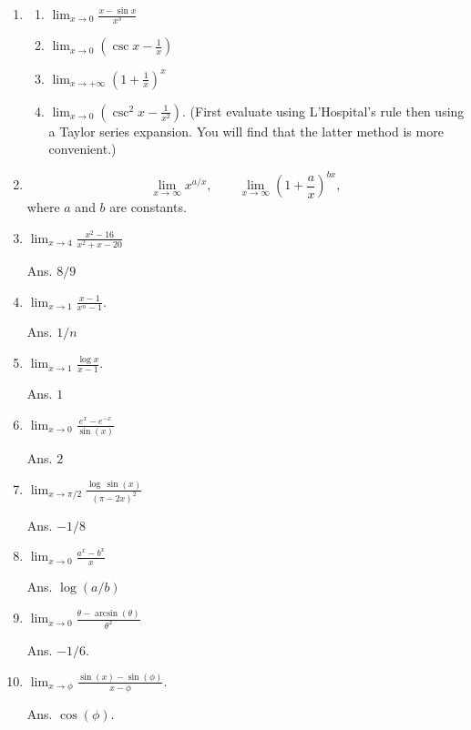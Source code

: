\begin{enumerate}
\item
  \begin{enumerate}
  \item
    $\lim_{x \to 0} \frac{x - \sin x}{x^3}$
  \item
    $\lim_{x \to 0} \left( \csc x - \frac{1}{x} \right)$
  \item
    $\lim_{x \to +\infty} \left( 1 + \frac{1}{x} \right)^x$
  \item
    $\lim_{x \to 0} \left( \csc^2 x - \frac{1}{x^2} \right)$.
    (First evaluate using L'Hospital's rule then using a Taylor series expansion.
    You will find that the latter method is more convenient.)
  \end{enumerate}


\item
  \[
  \lim_{x \to \infty} x^{a/x}, \qquad
  \lim_{x \to \infty} \left( 1 + \frac{a}{x} \right)^{b x},
  \]
  where $a$ and $b$ are constants.


\item
$\lim_{x \to 4}\frac{x^2-16}{x^2+x-20}$

Ans. $8/9$

\item
$\lim_{x \to 1}\frac{x-1}{x^n-1}$.

Ans. $1/n$

\item
$\lim_{x \to 1} \frac{\log x}{x-1}$.

Ans. $1$

\item
$\lim_{x \to 0} \frac{e^x-e^{-x}}{\sin(x)}$

Ans. $2$

\item
$\lim_{x \to \pi/2} \frac{\log\,\sin(x)}{(\pi-2x)^2}$

Ans. $-1/8$

\item
$\lim_{x \to 0} \frac{a^x-b^x}{x}$

Ans. $\log(a/b)$

\item
$\lim_{x \to 0} \frac{\theta -\arcsin(\theta)}{\theta^2}$

Ans. $-1/6$.

\item
$\lim_{x \to \phi} \frac{\sin(x)-\sin(\phi)}{x-\phi}$.

Ans. $\cos(\phi)$.



\end{enumerate}

